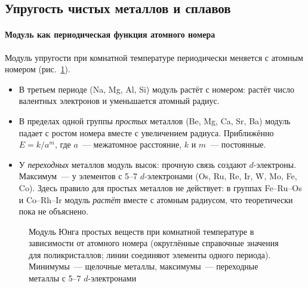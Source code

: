 \subsection{Упругость чистых металлов и сплавов}\label{ssec:elastic-alloys}

\paragraph{Модуль как периодическая функция атомного номера}
Модуль упругости при комнатной температуре периодически меняется с
атомным номером (рис.~\ref{fig:young-Z}).
\begin{itemize}
\item В третьем периоде (Na, Mg, Al, Si) модуль растёт с номером: растёт
число валентных электронов и уменьшается атомный радиус.
\item В пределах одной группы \emph{простых} металлов (Be, Mg, Ca, Sr, Ba)
модуль падает с ростом номера вместе с увеличением радиуса. Приближённо
$E=k/a^m$, где $a$~— межатомное расстояние, $k$ и $m$~— постоянные.
\item У \emph{переходных} металлов модуль высок: прочную связь создают
$d$-электроны. Максимум~— у элементов с 5--7 $d$-электронами (Os, Ru, Re,
Ir, W, Mo, Fe, Co). Здесь правило для простых металлов не действует: в
группах Fe--Ru--Os и Co--Rh--Ir модуль \emph{растёт} вместе с атомным
радиусом, что теоретически пока не объяснено.
\end{itemize}

\begin{figure}[ht]
\centering
{}
\caption{Модуль Юнга простых веществ при комнатной температуре в
зависимости от атомного номера (округлённые справочные значения для
поликристаллов; линии соединяют элементы одного периода). Минимумы~—
щелочные металлы, максимумы~— переходные металлы с 5--7 $d$-электронами}
\label{fig:young-Z}
\end{figure}


